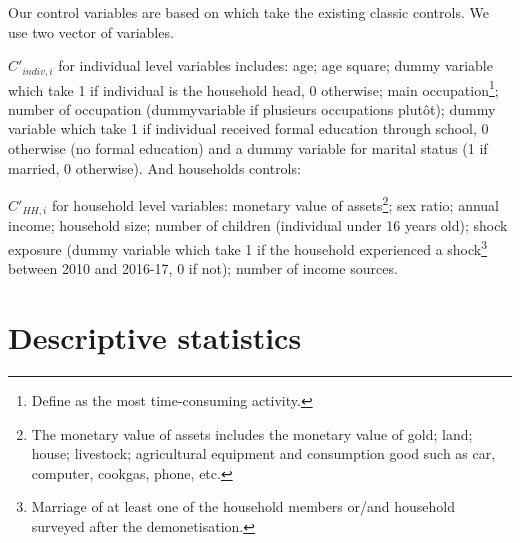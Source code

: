 \documentclass[a4paper, 11pt, onecolumn]{article}
\begin{document}
Our control variables are based on \cite{Reboul2020, Brown2014, Chichaibelu2017} which take the existing classic controls. 
We use two vector of variables.

$C'_{indiv,i}$ for individual level variables includes: age; age square; dummy variable which take 1 if individual is the household head, 0 otherwise; main occupation\footnote{Define as the most time-consuming activity.}; number of occupation (dummyvariable if plusieurs occupations plutôt); dummy variable which take 1 if individual received formal education through school, 0 otherwise (no formal education) and a dummy variable for marital status (1 if married, 0 otherwise). 
And households controls: 

$C'_{HH,i}$ for household level variables: monetary value of assets\footnote{The monetary value of assets includes the monetary value of gold; land; house; livestock; agricultural equipment and consumption good such as car, computer, cookgas, phone, etc.}; sex ratio; annual income; household size; number of children (individual under 16 years old); shock exposure (dummy variable which take 1 if the household experienced a shock\footnote{Marriage of at least one of the household members or/and household surveyed after the demonetisation.} between 2010 and 2016-17, 0 if not); number of income sources. 









\newpage
\section{Descriptive statistics}
\end{document}
